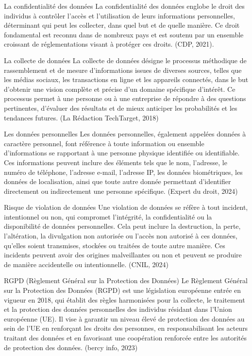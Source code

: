 \documentclass[
]{article}
\begin{document}
La confidentialité des données La confidentialité des données englobe le
droit des individus à contrôler l'accès et l'utilisation de leurs
informations personnelles, déterminant qui peut les collecter, dans quel
but et de quelle manière. Ce droit fondamental est reconnu dans de
nombreux pays et est soutenu par un ensemble croissant de
réglementations visant à protéger ces droits. (CDP, 2021).

La collecte de données La collecte de données désigne le processus
méthodique de rassemblement et de mesure d'informations issues de
diverses sources, telles que les médias sociaux, les transactions en
ligne et les appareils connectés, dans le but d'obtenir une vision
complète et précise d'un domaine spécifique d'intérêt. Ce processus
permet à une personne ou à une entreprise de répondre à des questions
pertinentes, d'évaluer des résultats et de mieux anticiper les
probabilités et les tendances futures. (La Rédaction TechTarget, 2018)

Les données personnelles Les données personnelles, également appelées
données à caractère personnel, font référence à toute information ou
ensemble d'informations se rapportant à une personne physique identifiée
ou identifiable. Ces informations peuvent inclure des éléments tels que
le nom, l'adresse, le numéro de téléphone, l'adresse e-mail, l'adresse
IP, les données biométriques, les données de localisation, ainsi que
toute autre donnée permettant d'identifier directement ou indirectement
une personne spécifique. (Expert du droit, 2024)

Risque de violation de données Une violation de données se réfère à tout
incident, intentionnel ou non, qui compromet l'intégrité, la
confidentialité ou la disponibilité de données personnelles. Cela peut
inclure la destruction, la perte, l'altération, la divulgation non
autorisée ou l'accès non autorisé à ces données, qu'elles soient
transmises, stockées ou traitées de toute autre manière. Ces incidents
peuvent avoir des origines malveillantes ou non et peuvent se produire
de manière accidentelle ou intentionnelle. (CNIL, 2024)

RGPD (Règlement Général sur la Protection des Données) Le Règlement
Général sur la Protection des Données (RGPD) est une législation
européenne entrée en vigueur en 2018, qui établit des règles harmonisées
pour la collecte, le traitement et la protection des données
personnelles des individus résidant dans l'Union européenne (UE). Il
vise à garantir un niveau élevé de protection des données au sein de
l'UE en renforçant les droits des personnes, en responsabilisant les
acteurs traitant des données et en favorisant une coopération renforcée
entre les autorités de protection des données. (bercy info, 2023)
\end{document}
